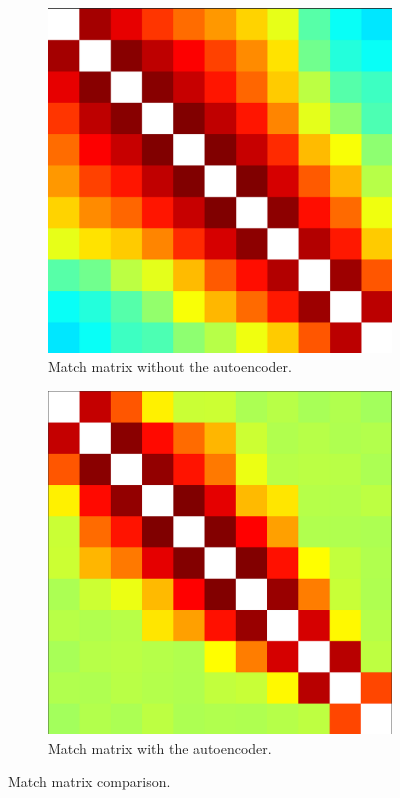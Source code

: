 \begin{figure}[H]
     \centering
          \begin{subfigure}[b]{0.45\textwidth}
		\centering
    		\includegraphics[width=\textwidth]{images/matrix.png}
		\caption{\centering Match matrix without the autoencoder.}
		\label{fig:matrix1}   
     \end{subfigure}
     \hfill
     \begin{subfigure}[b]{.45\textwidth}
		\centering
		\includegraphics[width=\textwidth]{images/matrixautoenc.png}  
		\caption{\centering Match matrix with the autoencoder.}
	    	\label{fig:matrixautoenc} 
     \end{subfigure}
        \caption{Match matrix comparison.}
        \label{fig:matrix}
\end{figure}

